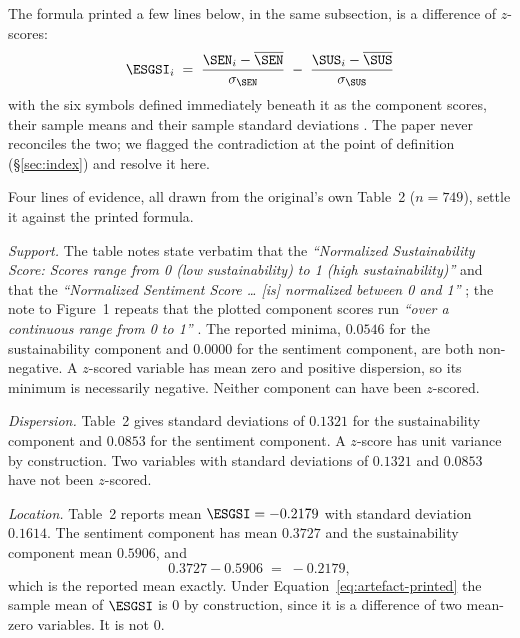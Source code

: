 \noindent The formula printed a few lines below, in the same subsection, is a
difference of $z$-scores:
\begin{equation}
\label{eq:artefact-printed}
\ESGSI_i \;=\; \frac{\SEN_i - \overline{\SEN}}{\sigma_{\SEN}}
\;-\; \frac{\SUS_i - \overline{\SUS}}{\sigma_{\SUS}}
\end{equation}
with the six symbols defined immediately beneath it as the component scores,
their sample means and their sample standard deviations
\citep[p.~4]{lagasio2024}. The paper never reconciles the two; we flagged the
contradiction at the point of definition (\S\ref{sec:index}) and resolve it here.

Four lines of evidence, all drawn from the original's own Table~2 ($n = 749$),
settle it against the printed formula.

\emph{Support.} The table notes state verbatim that the \emph{``Normalized
Sustainability Score: Scores range from 0 (low sustainability) to 1 (high
sustainability)''} and that the \emph{``Normalized Sentiment Score \dots
[is] normalized between 0 and 1''} \citep[p.~6]{lagasio2024}; the note to
Figure~1 repeats that the plotted component scores run \emph{``over a
continuous range from 0 to 1''} \citep[p.~5]{lagasio2024}. The reported
minima, $0.0546$ for the sustainability component and $0.0000$ for the
sentiment component, are both non-negative. A $z$-scored variable has mean
zero and positive dispersion, so its minimum is necessarily negative. Neither
component can have been $z$-scored.

\emph{Dispersion.} Table~2 gives standard deviations of $0.1321$ for the
sustainability component and $0.0853$ for the sentiment component. A $z$-score
has unit variance by construction. Two variables with standard deviations of
$0.1321$ and $0.0853$ have not been $z$-scored.

\emph{Location.} Table~2 reports mean $\ESGSI = -0.2179$ with standard
deviation $0.1614$. The sentiment component has mean $0.3727$ and the
sustainability component mean $0.5906$, and
\begin{equation}
\label{eq:artefact-identity}
0.3727 - 0.5906 \;=\; -0.2179 ,
\end{equation}
which is the reported mean exactly. Under Equation~\eqref{eq:artefact-printed}
the sample mean of $\ESGSI$ is $0$ by construction, since it is a difference of
two mean-zero variables. It is not $0$.

